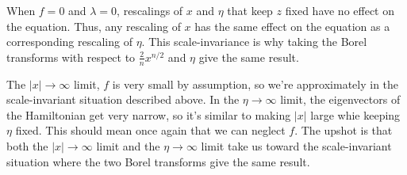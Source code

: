 \documentclass{article}
\theoremstyle{definition}
\theoremstyle{plain}
\begin{document}
When $f = 0$ and $\lambda = 0$, rescalings of $x$ and $\eta$ that keep $z$ fixed have no effect on the equation. Thus, any rescaling of $x$ has the same effect on the equation as a corresponding rescaling of $\eta$. This scale-invariance is why taking the Borel transforms with respect to $\tfrac{2}{n} x^{n/2}$ and $\eta$ give the same result.

The $|x| \to \infty$ limit, $f$ is very small by assumption, so we're approximately in the scale-invariant situation described above. In the $\eta \to \infty$ limit, the eigenvectors of the Hamiltonian get very narrow, so it's similar to making $|x|$ large whie keeping $\eta$ fixed. This should mean once again that we can neglect $f$. The upshot is that both the $|x| \to \infty$ limit and the $\eta \to \infty$ limit take us toward the scale-invariant situation where the two Borel transforms give the same result.
\end{document}
